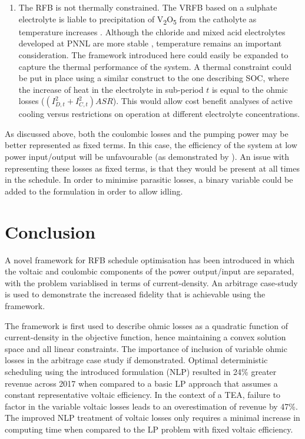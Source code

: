 \documentclass[preprint,3p,review,authoryear,10pt]{elsarticle}
\begin{document}
\begin{enumerate}
    \item The RFB is not thermally constrained. The VRFB based on a sulphate electrolyte is liable to precipitation of  V\textsubscript{2}O\textsubscript{5} from the catholyte as temperature increases \citep{Rahman2009,Vijayakumar2011}. Although the chloride and mixed acid electrolytes developed at PNNL are more stable \citep{Li2011,Kim2011}, temperature remains an important consideration. The framework introduced here could easily be expanded to capture the thermal performance of the system. A thermal constraint could be put in place using a similar construct to the one describing SOC, where the increase of heat in the electrolyte in sub-period $t$ is equal to the ohmic losses ($(I_{D,t}^{2} + I_{C,t}^{2})ASR$). This would allow cost benefit analyses of active cooling versus restrictions on operation at different electrolyte concentrations.

    
\end{enumerate}

As discussed above, both the coulombic losses and the pumping power may be better represented as fixed terms. In this case, the efficiency of the system at low power input/output will be unfavourable (as demonstrated by \cite{Nguyen2014}). An issue with representing these losses as fixed terms, is that they would be present at all times in the schedule. In order to minimise parasitic losses, a binary variable could be added to the formulation in order to allow idling.

\section{Conclusion} 
\label{sec:Conclusion}
A novel framework for RFB schedule optimisation has been introduced in which the voltaic and coulombic components of the power output/input are separated, with the problem variablised in terms of current-density. An arbitrage case-study is used to demonstrate the increased fidelity that is achievable using the framework.

The framework is first used to describe ohmic losses as a quadratic function of current-density in the objective function, hence maintaining a convex solution space and all linear constraints. The importance of inclusion of variable ohmic losses in the arbitrage case study if demonstrated. Optimal deterministic scheduling using the introduced formulation (NLP) resulted in 24\% greater revenue across 2017 when compared to a basic LP approach that assumes a constant representative voltaic efficiency. In the context of a TEA, failure to factor in the variable voltaic losses leads to an overestimation of revenue by 47\%. The improved NLP treatment of voltaic losses only requires a minimal increase in computing time when compared to the LP problem with fixed voltaic efficiency. 
\end{document}
